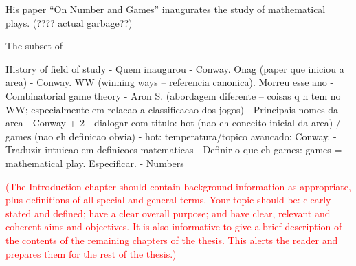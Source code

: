 His paper “On Number and Games” inaugurates the study of mathematical plays. (???? actual garbage??)

The subset of 

History of field of study
- Quem inaugurou
-  Conway. Onag (paper que iniciou a area)
- Conway. WW (winning ways – referencia canonica). Morreu esse ano
- Combinatorial game theory
- Aron S. (abordagem diferente – coisas q n  tem no WW; especialmente em relacao a classificacao dos jogos)
- Principais nomes da area
- Conway + 2 
- dialogar com titulo: hot (nao eh conceito inicial da area) / games (nao eh definicao obvia)
- hot: temperatura/topico avancado: Conway.
- Traduzir intuicao em definicoes matematicas
- Definir o que eh games: games = mathematical play. Especificar.
- Numbers

\textcolor{red}{(The Introduction chapter should contain background information as appropriate, plus definitions of all special and general terms. Your topic should be: clearly stated and defined; have a clear overall purpose; and have clear, relevant and coherent aims and objectives. It is also informative to give a brief description of the contents of the remaining chapters of the thesis. This alerts the reader and prepares them for the rest of the thesis.)}


